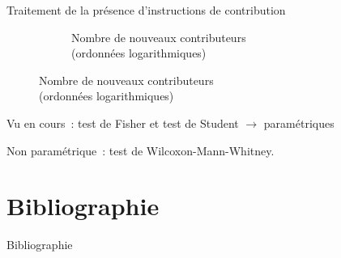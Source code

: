 \documentclass[usenames,dvipsnames,10pt]{beamer}
\begin{document}
\begin{frame}{Traitement de la présence d'instructions de contribution}
\begin{figure}
\begin{subfigure}[t]{0.45\textwidth}
            \caption{Nombre de nouveaux contributeurs\\(ordonnées logarithmiques)}
        \end{subfigure}
    \end{figure}

    Vu en cours : test de Fisher et test de Student $\rightarrow$ paramétriques

    Non paramétrique : test de Wilcoxon-Mann-Whitney.
\end{frame}

\section{Bibliographie}

\begin{frame}[allowframebreaks]{Bibliographie}
    \printbibliography{}
\end{frame}
\end{document}
